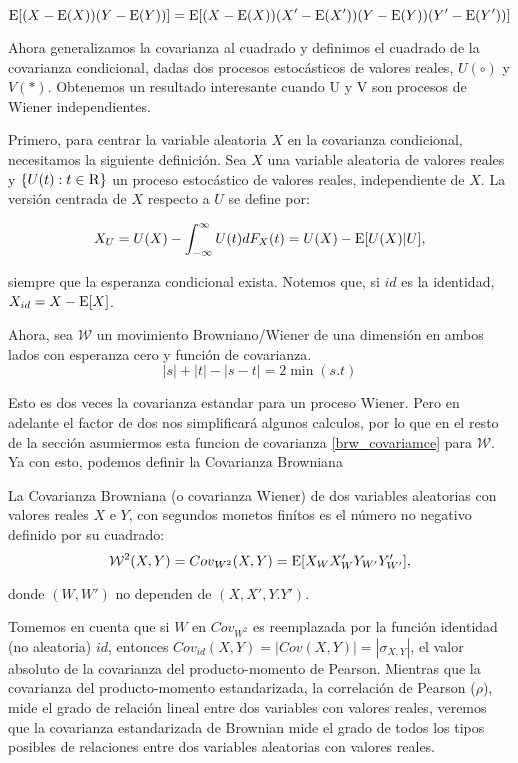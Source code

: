 		$$\operatorname{E}[(X-\operatorname{E}(X))(Y-\operatorname{E}(Y))] = \operatorname{E}[(X-\operatorname{E}(X))(X'-\operatorname{E}(X'))(Y-\operatorname{E}(Y))(Y'-\operatorname{E}(Y'))]	$$

		Ahora generalizamos la covarianza al cuadrado y definimos el cuadrado de la covarianza condicional, dadas dos procesos estocásticos de valores reales, $U(\circ)$ y $V(*)$. Obtenemos un resultado interesante cuando U y V son procesos de Wiener independientes.


		Primero, para centrar la variable aleatoria $X$ en la covarianza condicional, necesitamos la siguiente definici\'on. Sea $X$ una variable aleatoria de valores reales y $\{U(t): t \in \textsc{R}\}$ un proceso estoc\'astico de valores reales, independiente de $X$. La versi\'on centrada de $X$ respecto a $U$ se define por:

		$$
		X_U = U(X)-\int_{-\infty}^{\infty}U(t)dF_X(t)=U(X)-\operatorname{E}[U(X)|U],
		$$

		siempre que la esperanza condicional exista. Notemos que, si $id$ es la identidad, $X_{id}=X-\operatorname{E}[X]$. 

		Ahora, sea $\mathcal{W}$ un movimiento Browniano/Wiener de una dimensi\'on en ambos lados con esperanza cero y funci\'on de covarianza.
		\begin{equation}\label{brw_covariamce}
			|s|+|t|-|s-t|=2\min(s.t)
		\end{equation}
			

		Esto es dos veces la covarianza estandar para un proceso Wiener. Pero en adelante el factor de dos nos simplificar\'a algunos calculos, por lo que en el resto de la secci\'on asumiermos esta funcion de covarianza \ref{brw_covariamce} para $\mathcal{W}$. Ya con esto, podemos definir la Covarianza Browniana 

		\begin{defn}
			La Covarianza Browniana (o covarianza Wiener) de dos variables aleatorias con valores reales $X$ e $Y$, con segundos monetos fin\'itos es el n\'umero no negativo definido por su cuadrado:
			\begin{equation}\label{brw_cov}
				\mathcal{W}^2(X,Y)={Cov}_{{W}^2}(X,Y)=\operatorname{E}[X_{W}X'_{W}Y_{W'}Y'_{W'}],
			\end{equation}

			donde $({W},{W'})$ no dependen de $(X,X',Y.Y')$.
		\end{defn}

		Tomemos en cuenta que si ${W}$ en ${Cov}_{{W}^2}$ es reemplazada por la funci\'on identidad (no aleatoria) $id$, entonces ${Cov}_{id}(X, Y) = |{Cov}(X, Y)| = |\sigma_{X,Y}|$, el valor absoluto de la covarianza del producto-momento de Pearson. Mientras que la covarianza del producto-momento estandarizada, la correlación de Pearson ($\rho$), mide el grado de relaci\'on lineal entre dos variables con valores reales, veremos que la covarianza estandarizada de Brownian mide el grado de todos los tipos posibles de relaciones entre dos variables aleatorias con valores reales.

